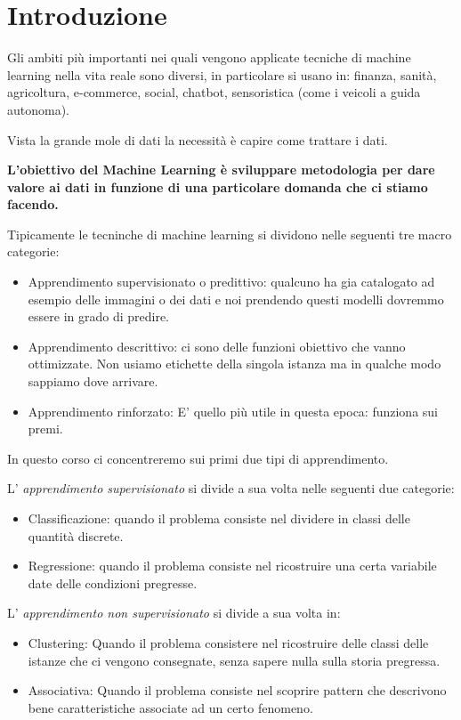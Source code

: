 \pagestyle{fancy}
\cfoot{\thepage}
\renewcommand{\footrulewidth}{0.25pt}


\section{Introduzione}
Gli ambiti più importanti nei quali vengono applicate tecniche di machine learning nella vita reale sono diversi, in particolare si usano in:
finanza, sanità, agricoltura, e-commerce, social, chatbot, sensoristica (come i veicoli a guida autonoma).

Vista la grande mole di dati la necessità è capire come trattare i dati.

\textbf{L'obiettivo del Machine Learning è sviluppare metodologia per dare valore ai dati in funzione di una particolare domanda che ci stiamo facendo.}

Tipicamente le tecninche di machine learning si dividono nelle seguenti tre macro categorie:
\begin{itemize}
	\item Apprendimento supervisionato o predittivo: qualcuno ha gia catalogato ad esempio delle immagini o dei dati e noi prendendo questi modelli dovremmo essere in grado di predire.
	\item Apprendimento descrittivo: ci sono delle funzioni obiettivo che vanno ottimizzate. Non usiamo etichette della singola istanza ma in qualche modo sappiamo dove arrivare.
	\item Apprendimento rinforzato: E' quello più utile in questa epoca: funziona sui premi.
\end{itemize}

In questo corso ci concentreremo sui primi due tipi di apprendimento.

L' \textit{apprendimento supervisionato} si divide a sua volta nelle seguenti due categorie:
\begin{itemize}
	\item Classificazione: quando il problema consiste nel dividere in classi delle quantità discrete.
	\item Regressione: quando il problema consiste nel ricostruire una certa variabile date delle condizioni pregresse.
\end{itemize}

L' \textit{apprendimento non supervisionato} si divide a sua volta in:
\begin{itemize}
	\item Clustering: Quando il problema consistere nel ricostruire delle classi delle istanze che ci vengono consegnate, senza sapere nulla sulla storia pregressa.
	\item Associativa: Quando il problema consiste nel scoprire pattern che descrivono bene caratteristiche associate ad un certo fenomeno.
\end{itemize}

